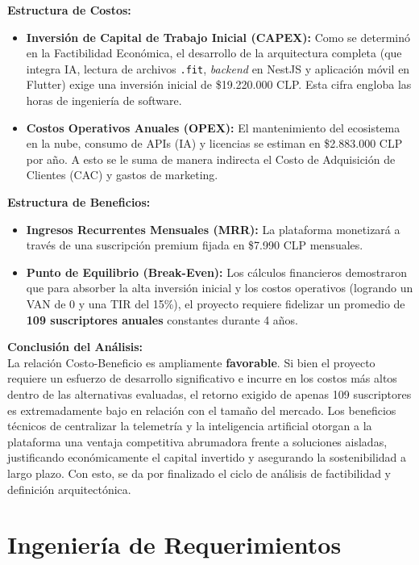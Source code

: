 \documentclass[12pt]{article}
\begin{document}
\textbf{Estructura de Costos:}
\begin{itemize}
    \item \textbf{Inversión de Capital de Trabajo Inicial (CAPEX):} Como se determinó en la Factibilidad Económica, el desarrollo de la arquitectura completa (que integra IA, lectura de archivos \texttt{.fit}, \textit{backend} en NestJS y aplicación móvil en Flutter) exige una inversión inicial de \$19.220.000 CLP. Esta cifra engloba las horas de ingeniería de software.
    \item \textbf{Costos Operativos Anuales (OPEX):} El mantenimiento del ecosistema en la nube, consumo de APIs (IA) y licencias se estiman en \$2.883.000 CLP por año. A esto se le suma de manera indirecta el Costo de Adquisición de Clientes (CAC) y gastos de marketing.
\end{itemize}

\textbf{Estructura de Beneficios:}
\begin{itemize}
    \item \textbf{Ingresos Recurrentes Mensuales (MRR):} La plataforma monetizará a través de una suscripción premium fijada en \$7.990 CLP mensuales.
    \item \textbf{Punto de Equilibrio (Break-Even):} Los cálculos financieros demostraron que para absorber la alta inversión inicial y los costos operativos (logrando un VAN de 0 y una TIR del 15\%), el proyecto requiere fidelizar un promedio de \textbf{109 suscriptores anuales} constantes durante 4 años.
\end{itemize}

\textbf{Conclusión del Análisis:}\\
La relación Costo-Beneficio es ampliamente \textbf{favorable}. Si bien el proyecto requiere un esfuerzo de desarrollo significativo e incurre en los costos más altos dentro de las alternativas evaluadas, el retorno exigido de apenas 109 suscriptores es extremadamente bajo en relación con el tamaño del mercado. Los beneficios técnicos de centralizar la telemetría y la inteligencia artificial otorgan a la plataforma una ventaja competitiva abrumadora frente a soluciones aisladas, justificando económicamente el capital invertido y asegurando la sostenibilidad a largo plazo. Con esto, se da por finalizado el ciclo de análisis de factibilidad y definición arquitectónica.

\newpage
\section{Ingeniería de Requerimientos}
\end{document}
